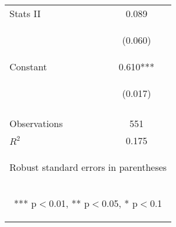 \begin{center}
\begin{tabular}{lc}
Stats II & 0.089 \\
\vspace{4pt} & \begin{footnotesize}(0.060)\end{footnotesize} \\
Constant & 0.610*** \\
 & \begin{footnotesize}(0.017)\end{footnotesize} \\
\vspace{4pt} & \begin{footnotesize}\end{footnotesize} \\
Observations & 551 \\
 $R^2$ & 0.175 \\ \hline
\multicolumn{2}{c}{\begin{footnotesize} Robust standard errors in parentheses\end{footnotesize}} \\
\multicolumn{2}{c}{\begin{footnotesize} *** p$<$0.01, ** p$<$0.05, * p$<$0.1\end{footnotesize}} \\
\end{tabular}
\end{center}